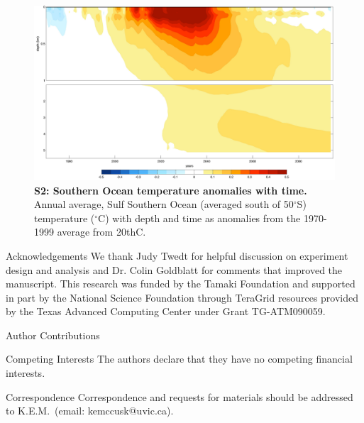 \documentclass{nature}
\begin{document}
\begin{figure}%
\noindent\includegraphics[width=39pc]{figures/SuppFig3.pdf}  %
\caption{\textbf{S2: Southern Ocean temperature anomalies with time.} Annual average, Sulf Southern Ocean (averaged south of 50$^\circ$S) temperature ($^\circ$C) with depth and time as anomalies from the 1970-1999 average from 20thC.}
\label{fig:supp2}
\end{figure}





%




\begin{addendum}
\item[Acknowledgements] We thank Judy Twedt for helpful discussion on experiment design and analysis and Dr. Colin Goldblatt for comments that improved the manuscript. This research was funded by the Tamaki Foundation and supported in part by the National Science Foundation through TeraGrid resources provided by the Texas Advanced Computing Center under Grant TG-ATM090059.
\item[Author Contributions] 
 \item[Competing Interests] The authors declare that they have no competing financial interests.
\item[Correspondence] Correspondence and requests for materials should be addressed to K.E.M.~(email: kemccusk@uvic.ca).
\end{addendum}

\end{document}
